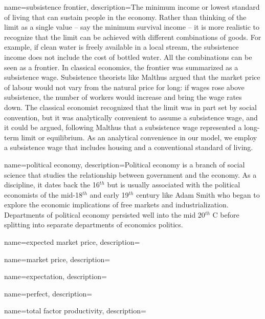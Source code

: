 {
name=subsistence frontier,
description={The minimum income or lowest standard of living that can sustain people in the economy. Rather than thinking of the limit as a single value -- say the minimum survival income -- it is more realistic to recognize that the limit can be achieved with different combinations of goods. For example, if clean water is freely available in a local stream, the subsistence income does not include the cost of bottled water. All the combinations can be seen as a \gls{frontier}. \newline In classical economics, the frontier was summarized as a subsistence wage. Subsistence theorists like Malthus argued that the market price of labour would not vary from the natural price for long: if wages rose above subsistence, the number of workers would increase and bring the wage rates down. The classical economist recognized that the limit was in part set by social convention, but it was analytically convenient to assume a subsistence wage, and it could be argued, following Malthus that a subsistence wage  represented a long-term limit or \gls{equilibrium}. As an analytical convenience in our model, we employ a subsistence wage that includes housing and a conventional standard of living.  }
}

{
name=political economy,
description={Political economy is a branch of social science that studies the relationship  between government and the economy. As a discipline, it dates back the  16$^{th}$ but is usually associated with the political economists of the mid-18$^{th}$ and  early 19$^{th}$  century like Adam Smith who began to explore the economic implications of free markets and industrialization. Departments of political economy persisted well into the mid 20$^{th}$ C before splitting into separate departments of economics politics.\cite{helleiner20PoliticalEconomy2018}}
}

{
name=expected market price,
description={}
}

{
name=market price,
description={}
}

{
name=expectation,
description={}
}

{
name=perfect,
description={}
}

{
name=total factor productivity,
description={}
}

